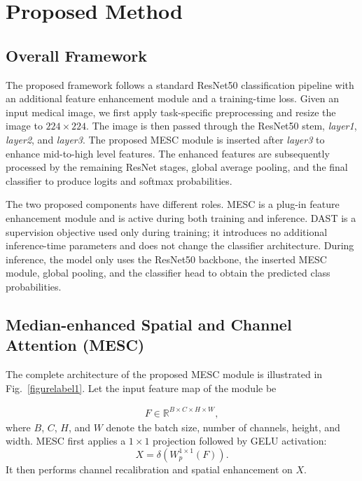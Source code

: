 \documentclass[runningheads]{llncs}
\begin{document}
\section{Proposed Method}

\subsection{Overall Framework}

The proposed framework follows a standard ResNet50 classification pipeline with an additional feature enhancement module and a training-time loss. Given an input medical image, we first apply task-specific preprocessing and resize the image to \(224 \times 224\). The image is then passed through the ResNet50 stem, \textit{layer1}, \textit{layer2}, and \textit{layer3}. The proposed MESC module is inserted after \textit{layer3} to enhance mid-to-high level features. The enhanced features are subsequently processed by the remaining ResNet stages, global average pooling, and the final classifier to produce logits and softmax probabilities.

The two proposed components have different roles. MESC is a plug-in feature enhancement module and is active during both training and inference. DAST is a supervision objective used only during training; it introduces no additional inference-time parameters and does not change the classifier architecture. During inference, the model only uses the ResNet50 backbone, the inserted MESC module, global pooling, and the classifier head to obtain the predicted class probabilities.

\subsection{Median-enhanced Spatial and Channel Attention (MESC)}

The complete architecture of the proposed MESC module is illustrated in Fig.~\ref{figurelabel1}. Let the input feature map of the module be

\begin{equation}
\begin{aligned}
    F \in \mathbb{R}^{B \times C \times H \times W},
\end{aligned}
\end{equation}
where \(B\), \(C\), \(H\), and \(W\) denote the batch size, number of channels, height, and width. MESC first applies a \(1 \times 1\) projection followed by GELU activation:
\begin{equation}
    X = \delta\left(W_p^{1\times 1}(F)\right).
\end{equation}
It then performs channel recalibration and spatial enhancement on \(X\).
\end{document}
